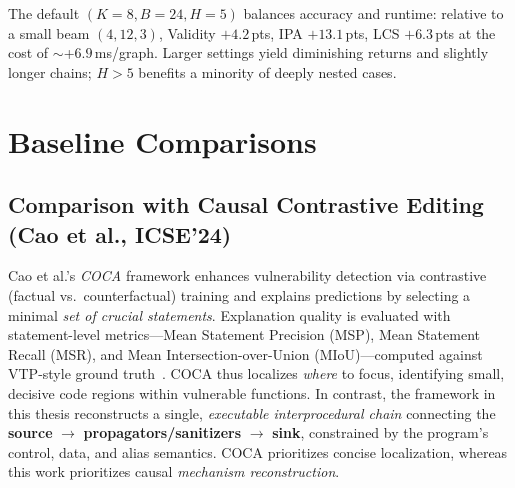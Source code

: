 \documentclass{buthesis}
\begin{document}
\noindent The default $(K{=}8,B{=}24,H{=}5)$ balances accuracy and runtime: relative to a small beam $(4,12,3)$, Validity $+4.2$\,pts, IPA $+13.1$\,pts, LCS $+6.3$\,pts at the cost of $\sim$+$6.9$\,ms/graph. Larger settings yield diminishing returns and slightly longer chains; $H{>}5$ benefits a minority of deeply nested cases.





\section{Baseline Comparisons}
\label{sec:results-baselines}

\subsection{Comparison with Causal Contrastive Editing (Cao et al., ICSE’24)}
\label{sec:results-cao}

Cao et al.’s \emph{COCA} framework enhances vulnerability detection via contrastive (factual vs.\ counterfactual) training and explains predictions by selecting a minimal \emph{set of crucial statements}. Explanation quality is evaluated with statement-level metrics—Mean Statement Precision (MSP), Mean Statement Recall (MSR), and Mean Intersection-over-Union (MIoU)—computed against VTP-style ground truth~\cite{Cao2024ICSE}. COCA thus localizes \emph{where} to focus, identifying small, decisive code regions within vulnerable functions. In contrast, the framework in this thesis reconstructs a single, \emph{executable interprocedural chain} connecting the \textbf{source} $\rightarrow$ \textbf{propagators/sanitizers} $\rightarrow$ \textbf{sink}, constrained by the program’s control, data, and alias semantics. COCA prioritizes concise localization, whereas this work prioritizes causal \emph{mechanism reconstruction}.
\end{document}
